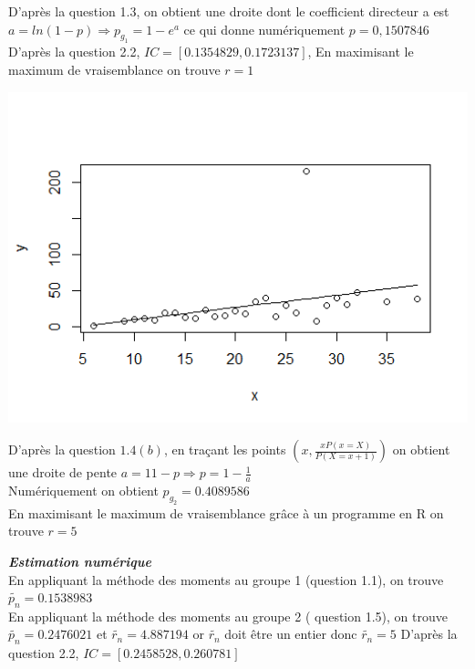 \documentclass[12pt]{article}
\newcommand{\dsp}{\displaystyle}
\begin{document}
\begin{enumerate}
D'après la question 1.3, on obtient une droite dont le coefficient directeur a est $a = ln(1-p) \Rightarrow p_{g_{1}} = 1 - e^{a} $ ce qui donne numériquement $ p=0,1507846 $\\
D'après la question 2.2, $ IC = [0.1354829, 0.1723137]$, En maximisant le maximum de vraisemblance on trouve $r=1$

\begin{center}
\includegraphics[width=15cm]{graphics/q2_2-groupe2.png}
\label{fig3}
\end{center}

D'après la question $1.4(b)$, en traçant les points $\left( x, \dsp \frac{xP(x =X)}{P(X=x+1)} \right)$ on obtient une droite de pente $a = \dsp {1}{1-p} \Rightarrow p = 1 - \frac{1}{a}$ \\
Numériquement on obtient $ p_{g_{2}} = 0.4089586 $\\
En maximisant le maximum de vraisemblance grâce à un programme en R on trouve $r=5$

\textbf{\textit{Estimation numérique}}\\
En appliquant la méthode des moments au groupe 1 (question 1.1), on trouve $\tilde{p_n} = 0.1538983$ \\


\vspace{5mm}
En appliquant la méthode des moments au groupe 2 ( question 1.5), on trouve $\tilde{p_n} = 0.2476021 $  et $\tilde{r_n} = 4.887194$ or $\tilde{r_n}$ doit être un entier donc $\tilde{r_n} = 5$
D'après la question 2.2, $ IC = [0.2458528,0.260781]$


\end{enumerate}
\end{document}
